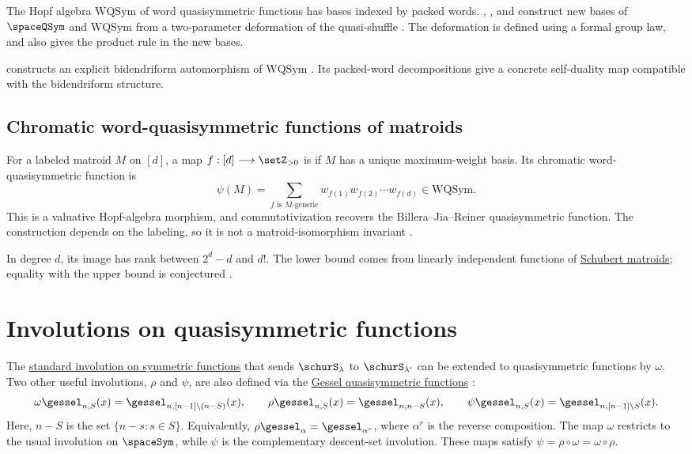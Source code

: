 The Hopf algebra $\mathrm{WQSym}$ of word quasisymmetric functions has bases
indexed by packed words.  ,
, and  construct new
bases of $\spaceQSym$ and $\mathrm{WQSym}$ from a two-parameter deformation
of the quasi-shuffle \cite{BouillotNovelliThibon2022x}.  The deformation is
defined using a formal group law, and also gives the product rule in the new
bases.

 constructs an explicit bidendriform automorphism of
$\mathrm{WQSym}$ \cite{Mlodecki2024}.  Its packed-word decompositions give a
concrete self-duality map compatible with the bidendriform structure.

\subsection[chromaticWordQuasisymmetricMatroid]{Chromatic word-quasisymmetric functions of matroids}

For a labeled matroid $M$ on $[d]$, a map
$f:[d]\longrightarrow\setZ_{>0}$ is  if $M$ has a unique
maximum-weight basis.  Its chromatic word-quasisymmetric function is
\[
 \psi(M)=\sum_{f\text{ is }M\text{-generic}}
 w_{f(1)}w_{f(2)}\dotsm w_{f(d)} \in \mathrm{WQSym}.
\]
This is a valuative Hopf-algebra morphism, and commutativization recovers the
Billera--Jia--Reiner quasisymmetric function.  The construction depends on
the labeling, so it is not a matroid-isomorphism invariant
\cite{PenaguiaoRehberg2026x}.

In degree $d$, its image has rank between $2^d-d$ and $d!$.  The lower bound
comes from linearly independent functions of
\hyperref[schubertMatroidDefinition]{Schubert matroids}; equality with the
upper bound is conjectured
\cite[Thms.~1.1--1.2 and Conj.~1.3]{PenaguiaoRehberg2026x}.


\section[standardQuasiInvolution]{Involutions on quasisymmetric functions}

The \hyperref[standardInvolution]{standard involution on symmetric functions}
that sends $\schurS_\lambda$ to $\schurS_{\lambda'}$
can be extended to quasisymmetric functions by $\omega$.
Two other useful involutions, $\rho$ and $\psi$, are also defined via the
\hyperref[gessel]{Gessel quasisymmetric functions}
\cite{LuotoMykytiukWilligenburg2013}:
\[
\omega \gessel_{n,S}(x)
  = \gessel_{n,[n-1]\setminus (n-S)}(x), \qquad
\rho \gessel_{n,S}(x)
  = \gessel_{n,n-S}(x), \qquad
\psi \gessel_{n,S}(x)
  = \gessel_{n, [n-1]\setminus S}(x).
\]
Here, $n-S$ is the set $\{n-s : s \in S\}$.
Equivalently, $\rho\gessel_\alpha=\gessel_{\alpha^r}$, where $\alpha^r$
is the reverse composition.
The map $\omega$ restricts to the usual involution on $\spaceSym$, while
$\psi$ is the complementary descent-set involution.  These maps satisfy
$\psi=\rho\circ\omega=\omega\circ\rho$.

